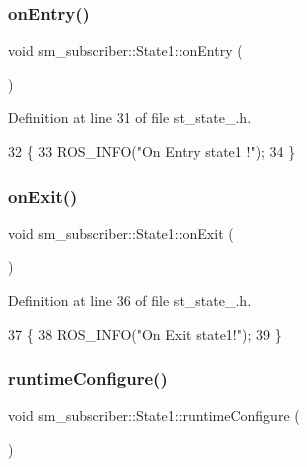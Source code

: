 \subsubsection{\texorpdfstring{on\+Entry()}{onEntry()}}
{\footnotesize\ttfamily void sm\+\_\+subscriber\+::\+State1\+::on\+Entry (\begin{DoxyParamCaption}{ }\end{DoxyParamCaption})\hspace{0.3cm}{\ttfamily [inline]}}



Definition at line 31 of file st\+\_\+state\+\_.\+h.


\begin{DoxyCode}
32   \{
33     ROS\_INFO(\textcolor{stringliteral}{"On Entry state1 !"});
34   \}
\end{DoxyCode}
\mbox{\label{structsm__subscriber_1_1State1_a539b0ab5ba62c8b2298c1efc678c6683}} 
\subsubsection{\texorpdfstring{on\+Exit()}{onExit()}}
{\footnotesize\ttfamily void sm\+\_\+subscriber\+::\+State1\+::on\+Exit (\begin{DoxyParamCaption}{ }\end{DoxyParamCaption})\hspace{0.3cm}{\ttfamily [inline]}}



Definition at line 36 of file st\+\_\+state\+\_.\+h.


\begin{DoxyCode}
37   \{
38     ROS\_INFO(\textcolor{stringliteral}{"On Exit state1!"});
39   \}
\end{DoxyCode}
\mbox{\label{structsm__subscriber_1_1State1_a53ed360656c26531101bda2397f8c024}} 
\subsubsection{\texorpdfstring{runtime\+Configure()}{runtimeConfigure()}}
{\footnotesize\ttfamily void sm\+\_\+subscriber\+::\+State1\+::runtime\+Configure (\begin{DoxyParamCaption}{ }\end{DoxyParamCaption})\hspace{0.3cm}{\ttfamily [inline]}}



